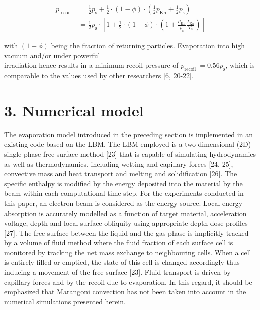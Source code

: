 \documentclass[10pt]{article}
\begin{document}
\begin{align*}
p_{\text {recoil }} & =\frac{1}{2} p_{\mathrm{s}}+\frac{1}{2} \cdot(1-\phi) \cdot\left(\frac{1}{2} p_{\mathrm{Kn}}+\frac{1}{2} p_{\mathrm{s}}\right) \\
& =\frac{1}{2} p_{\mathrm{s}} \cdot\left[1+\frac{1}{2} \cdot(1-\phi) \cdot\left(1+\frac{\rho_{\mathrm{Kn}}}{\rho_{\mathrm{s}}} \frac{T_{\mathrm{Kn}}}{T_{\mathrm{s}}}\right)\right] \tag{10}
\end{align*}


with $(1-\phi)$ being the fraction of returning particles. Evaporation into high vacuum and/or under powerful\\
irradiation hence results in a minimum recoil pressure of $p_{\text {recoil }}=0.56 p_{\mathrm{s}}$, which is comparable to the values used by other researchers [6, 20-22].

\section*{3. Numerical model}
The evaporation model introduced in the preceding section is implemented in an existing code based on the LBM. The LBM employed is a two-dimensional (2D) single phase free surface method [23] that is capable of simulating hydrodynamics as well as thermodynamics, including wetting and capillary forces [24, 25], convective mass and heat transport and melting and solidification [26]. The specific enthalpy is modified by the energy deposited into the material by the beam within each computational time step. For the experiments conducted in this paper, an electron beam is considered as the energy source. Local energy absorption is accurately modelled as a function of target material, acceleration voltage, depth and local surface obliquity using appropriate depth-dose profiles [27]. The free surface between the liquid and the gas phase is implicitly tracked by a volume of fluid method where the fluid fraction of each surface cell is monitored by tracking the net mass exchange to neighbouring cells. When a cell is entirely filled or emptied, the state of this cell is changed accordingly thus inducing a movement of the free surface [23]. Fluid transport is driven by capillary forces and by the recoil due to evaporation. In this regard, it should be emphasized that Marangoni convection has not been taken into account in the numerical simulations presented herein.
\end{document}
